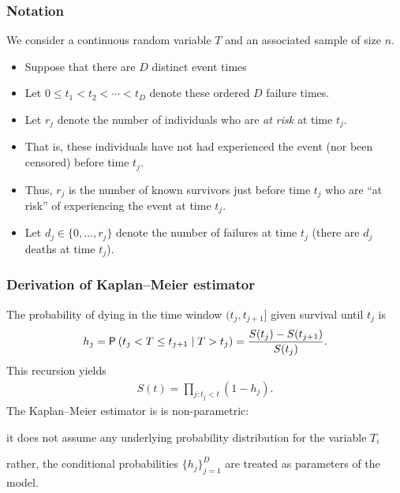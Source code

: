 \documentclass{beamer}
\begin{document}
\begin{frame}
\frametitle{Notation}
We consider a continuous random variable $T$ and an associated sample of size $n$.
\begin{itemize}
\item Suppose that there are $D$ distinct event times
\item Let $0 \leq t_1 < t_2 < \cdots < t_D$ denote these ordered $D$ failure times. 
\item Let $r_j$ denote the number of individuals who are \emph{at risk} at time $t_j$. 
\bi
\item That is, these individuals have not had experienced the event (nor been censored) before time $t_j$. 
\item Thus, $r_j$ is the number of known survivors just before time $t_j$ who are ``at risk'' of experiencing the event at time $t_j$.
\ei
\item Let $d_j \in \{0, \ldots, r_j\}$ denote the number of failures at time $t_j$ (there are $d_j$ deaths at time $t_j$). 
\end{itemize}
\end{frame}
\begin{frame}
\frametitle{Derivation of Kaplan--Meier estimator}
 The probability of dying in the time window $(t_j, t_{j+1}]$ given survival until $t_j$ is 
 \begin{align*}
  h_j = \P{t_j < T \leq t_{j+1} \mid T > t_j} 
  = \frac{S(t_j) - S(t_{j+1})}{S(t_j)}.
 \end{align*}
This recursion yields \begin{align*}
S(t) = \prod_{j: t_j < t} (1-h_j).
\end{align*}
The Kaplan--Meier estimator is is \alert{non-parametric}: 
\bi \item it does not assume any underlying probability distribution for the variable $T_i$
\item rather, the conditional probabilities $\{h_j\}_{j=1}^D$ are treated as parameters of the model.
\ei
\end{frame}
\end{document}
